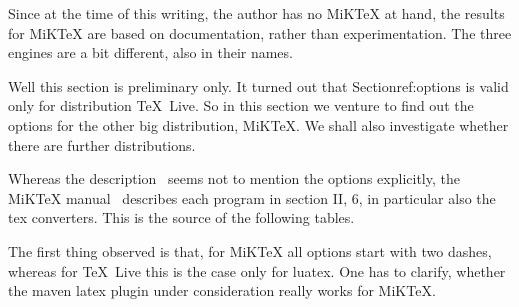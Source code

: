 \documentclass{article}
\newcommand{\texlive}{\TeX~Live}
\newcommand{\miktex}{MiKTeX}
\begin{document}
Since at the time of this writing, the author has no \miktex{} at hand, 
the results for \miktex{} are based on documentation, rather than experimentation. 
The three engines are a bit different, also in their names. 


Well this section is preliminary only. 
It turned out that Section{ref:options} is valid only for distribution \texlive. 
So in this section we venture to find out the options for the other big distribution, 
\miktex. 
We shall also investigate whether there are further distributions. 

Whereas the description~\cite{Texlive} seems not to mention the options explicitly, 
the \miktex{} manual~\cite{MiKTeX} describes each program in section II, 6, 
in particular also the tex converters. 
This is the source of the following tables. 


The first thing observed is that, for \miktex{} all options start with two dashes, 
whereas for \texlive{} this is the case only for luatex. 
One has to clarify, whether the maven latex plugin under consideration really works for \miktex. 
\end{document}

